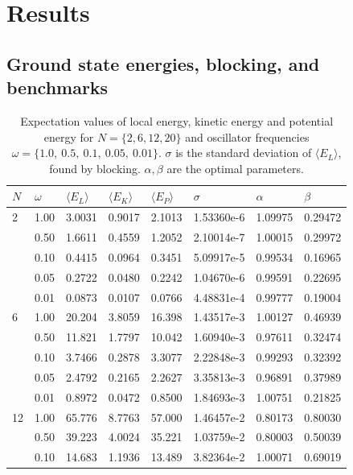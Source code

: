 \documentclass[english, a4paper]{article}
\newcommand\bk[1]{\langle#1\rangle}
\begin{document}
	
	
	
	\section{Results}
	\subsection{Ground state energies, blocking, and benchmarks}
		\begin{table}[H]
			\begin{center}
				\caption{Expectation values of local energy, kinetic energy and potential energy for $N=\{2,6,12,20\}$ and oscillator frequencies $\omega = \{1.0,\:0.5,\:0.1,\:0.05,\:0.01\}$. $\sigma$ is the standard deviation of $\langle E_L\rangle$, found by blocking. $\alpha,\beta$ are the optimal parameters.}
				\begin{tabularx}{\textwidth}{@{}YYYYYYYY@{}}
					$N$	& $\omega$ & $\bk{E_L}$ & $\bk{E_K}$ & $\bk{E_P}$ & $\sigma$ & $\alpha$ & $\beta$\\
						&	1.00 & 3.0031 & 0.9017 & 2.1013 & 1.53360e-6 & 1.09975 & 0.29472 \\
					&	0.50 & 1.6611 & 0.4559 & 1.2052 & 2.10014e-7 & 1.00015 & 0.29972 \\
					&	0.10 & 0.4415 & 0.0964 & 0.3451 & 5.09917e-5 & 0.99534 & 0.16965 \\
					&	0.05 & 0.2722 & 0.0480 & 0.2242 & 1.04670e-6 & 0.99591 & 0.22695 \\
					&   0.01 & 0.0873 & 0.0107 & 0.0766 & 4.48831e-4 & 0.99777 & 0.19004 \\
					   &	1.00 & 20.204 & 3.8059 & 16.398 & 1.43517e-3 & 1.00127 & 0.46939 \\
					&	0.50 & 11.821 & 1.7797 & 10.042 & 1.60940e-3 & 0.97611 & 0.32474 \\
					&	0.10 & 3.7466 & 0.2878 & 3.3077 & 2.22848e-3 & 0.99293 & 0.32392 \\
					&	0.05 & 2.4792 & 0.2165 & 2.2627 & 3.35813e-3 & 0.96891 & 0.37989 \\
					&   0.01 & 0.8972 & 0.0472 & 0.8500 & 1.84693e-3 & 1.00751 & 0.21825 \\
					  &	1.00 & 65.776 & 8.7763 & 57.000 & 1.46457e-2 & 0.80173 & 0.80030 \\
					&	0.50 & 39.223 & 4.0024 & 35.221 & 1.03759e-2 & 0.80003 & 0.50039 \\
					&	0.10 & 14.683 & 1.1936 & 13.489 & 3.82364e-2 & 1.00071 & 0.69019 \\

\end{tabularx}
\end{center}
\end{table}
\end{document}
